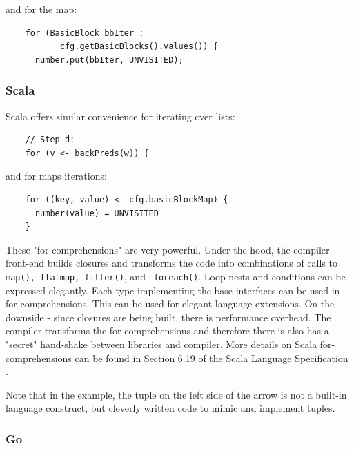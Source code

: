 and for the map:

\begin{footnotesize}
\begin{verbatim}
    for (BasicBlock bbIter : 
           cfg.getBasicBlocks().values()) {
      number.put(bbIter, UNVISITED);
\end{verbatim}
\end{footnotesize}

\subsubsection{Scala}

Scala offers similar convenience for iterating over lists:

\begin{footnotesize}
\begin{verbatim}
    // Step d:
    for (v <- backPreds(w)) {
\end{verbatim}
\end{footnotesize}

and for maps iterations:

\begin{footnotesize}
\begin{verbatim}
    for ((key, value) <- cfg.basicBlockMap) {
      number(value) = UNVISITED
    }
\end{verbatim}
\end{footnotesize}

These "for-comprehensions" are very powerful. Under the hood, the
compiler front-end builds closures and transforms the code into
combinations of calls to {\tt map(), flatmap{}, filter()}, and {\tt
  foreach()}. Loop nests and conditions can be expressed
elegantly. Each type implementing the base interfaces can be used in
for-comprehensions. This can be used for elegant language
extensions. On the downside - since closures are being built, there is
performance overhead. The compiler transforms the for-comprehensions
and therefore there is also has a "secret" hand-shake between
libraries and compiler. More details on Scala for-comprehensions can
be found in Section 6.19 of the Scala Language Specification
\cite{Scala-ref}.

Note that in the example, the tuple on the left side of the
arrow is not a built-in language
construct, but cleverly written code to mimic and implement tuples.

\subsubsection{Go}

